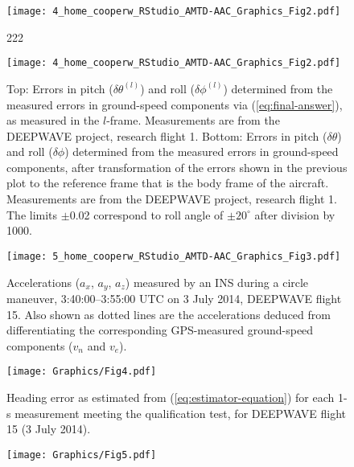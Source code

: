 \documentclass[english,british,amtd,bookmarks=false,unicode=true]{copernicus}\usepackage[]{graphicx}\usepackage[]{color}
\begin{document}
\begin{center}
\begin{figure}
\texttt{[image: 4\_home\_cooperw\_RStudio\_AMTD-AAC\_Graphics\_Fig2.pdf]}

\caption{222}


\end{figure}
\begin{figure}
\begin{centering}
\texttt{[image: 4\_home\_cooperw\_RStudio\_AMTD-AAC\_Graphics\_Fig2.pdf]}
\par\end{centering}

\caption{Top: Errors in pitch ($\delta\theta^{(l)}$) and roll ($\delta\phi^{(l)}$) determined from the measured errors in ground-speed components via (\ref{eq:final-answer}), as measured in the $l$-frame. Measurements are from the DEEPWAVE project, research flight 1. Bottom: Errors in pitch ($\delta\theta$) and roll ($\delta\phi$) determined from the measured errors in ground-speed components, after transformation of the errors shown in the previous plot to the reference frame that is the body frame of the aircraft. Measurements are from the DEEPWAVE project, research flight 1. The limits $\pm$0.02 correspond to roll angle of $\pm 20^{\circ}$ after division by 1000.\label{fig:processing-2}%
}
\end{figure}
\begin{figure}
\begin{centering}
\texttt{[image: 5\_home\_cooperw\_RStudio\_AMTD-AAC\_Graphics\_Fig3.pdf]}
\par\end{centering}

\caption{Accelerations ($a_x$, $a_y$, $a_z$) measured by an INS during a circle maneuver, 3:40:00--3:55:00 UTC on 3 July 2014, DEEPWAVE flight 15. Also shown as dotted lines are the accelerations deduced from differentiating the corresponding GPS-measured ground-speed components ($v_n$ and $v_e$).\label{fig:get-b-vector-and-transform}%
}
\end{figure}
\begin{figure}
\begin{centering}
\texttt{[image: Graphics/Fig4.pdf]}
\par\end{centering}

\caption{Heading error as estimated from (\ref{eq:estimator-equation}) for each 1-s measurement meeting the qualification test, for DEEPWAVE flight 15 (3 July 2014).\label{fig:error-components}%
}
\end{figure}
\begin{figure}
\begin{centering}
\texttt{[image: Graphics/Fig5.pdf]}
\par\end{centering}


\end{figure}
\end{center}
\end{document}
